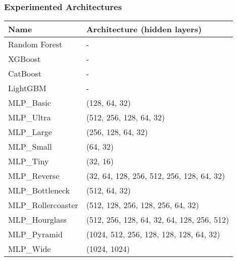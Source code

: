 \subsubsection{Experimented Architectures}
\begin{table}[ht!]
    \centering
    \footnotesize
    \begin{tabular}{|l|l|}
        \hline
        \textbf{Name}           & \textbf{Architecture (hidden layers)}                                 \\ \hline
        Random Forest                 & -                                                     \\ \hline
        XGBoost                 & -                                                     \\ \hline
        CatBoost                & -                                                     \\ \hline
        LightGBM                & -                                                     \\ \hline
        MLP\_Basic              & (128, 64, 32)                                         \\ \hline
        MLP\_Ultra              & (512, 256, 128, 64, 32)                               \\ \hline
        MLP\_Large              & (256, 128, 64, 32)                                    \\ \hline
        MLP\_Small              & (64, 32)                                              \\ \hline
        MLP\_Tiny               & (32, 16)                                              \\ \hline
        MLP\_Reverse            & (32, 64, 128, 256, 512, 256, 128, 64, 32)             \\ \hline
        MLP\_Bottleneck         & (512, 64, 32)                                         \\ \hline
        MLP\_Rollercoaster      & (512, 128, 256, 128, 256, 64, 32)                     \\ \hline
        MLP\_Hourglass          & (512, 256, 128, 64, 32, 64, 128, 256, 512)            \\ \hline
        MLP\_Pyramid            & (1024, 512, 256, 128, 128, 128, 64, 32)               \\ \hline
        MLP\_Wide               & (1024, 1024)                                          \\ \hline

\end{tabular}
\end{table}

